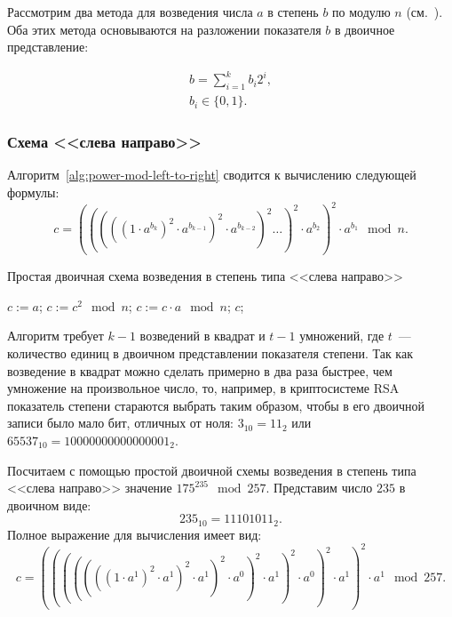 Рассмотрим два метода для возведения числа $a$ в степень $b$ по модулю $n$ (см.~\cite[9.3.1. Простые двоичные схемы]{Crandall:Pomerance:2011}). Оба этих метода основываются на разложении показателя $b$ в двоичное представление:

\begin{equation}
	\begin{array}{l}
		b = \sum\limits_{i=1}^{k} b_i 2^i, \\
		b_i \in \{0, 1\}.
	\end{array}
	\label{eq:power-mod-b}
\end{equation}

\subsubsection{Схема <<слева направо>>}

Алгоритм~\ref{alg:power-mod-left-to-right} сводится к вычислению следующей формулы:
\[ c = \left( \left( \left( \left( \left( 1 \cdot a^{b_k} \right)^2 \cdot a^{b_{k-1}} \right)^2 \cdot a^{b_{k-2}} \right)^2 \dots \right)^2 \cdot a^{b_2} \right)^2 \cdot a^{b_1} \mod n.\]

\begin{algorithm}[iht]
	\caption{Простая двоичная схема возведения в степень типа <<слева направо>>\label{alg:power-mod-left-to-right}}
	\begin{algorithmic}
		\STATE $c := a$;
			\STATE $c := c^2 \mod n$;
				\STATE $c := c \cdot a \mod n$;
			\ENDIF
		\ENDFOR
		\RETURN $c$;
	\end{algorithmic}
\end{algorithm}

Алгоритм требует $k-1$ возведений в квадрат и $t-1$ умножений, где $t$~--- количество единиц в двоичном представлении показателя степени. Так как возведение в квадрат можно сделать примерно в два раза быстрее, чем умножение на произвольное число, то, например, в криптосистеме RSA показатель степени стараются выбрать таким образом, чтобы в его двоичной записи было мало бит, отличных от ноля: $3_{10} = 11_{2}$ или $65537_{10} = 10000000000000001_{2}$.

\example Посчитаем с помощью простой двоичной схемы возведения в степень типа <<слева направо>> значение $175^{235} \mod 257$. Представим число $235$ в двоичном виде:
\[ 235_{10} = 11101011_{2}.\]
Полное выражение для вычисления имеет вид:
\[ c = (((((((1 \cdot a^1)^2 \cdot a^1)^2 \cdot a^1)^2 \cdot a^0)^2 \cdot a^1)^2 \cdot a^0)^2 \cdot a^1)^2 \cdot a^1 \mod 257.\]

